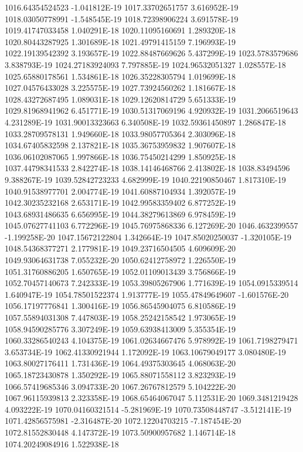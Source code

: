 1016.64354524523  -1.041812E-19
1017.33702651757  3.616952E-19
1018.03050778991  -1.548545E-19
1018.72398906224  3.691578E-19
1019.41747033458  1.040291E-18
1020.11095160691  1.289320E-18
1020.80443287925  1.301689E-18
1021.49791415159  7.196993E-19
1022.19139542392  3.193657E-19
1022.88487669626  5.437299E-19
1023.5783579686  3.838793E-19
1024.27183924093  7.797885E-19
1024.96532051327  1.028557E-18
1025.65880178561  1.534861E-18
1026.35228305794  1.019699E-18
1027.04576433028  3.225575E-19
1027.73924560262  1.181667E-18
1028.43272687495  1.089031E-18
1029.12620814729  5.651333E-19
1029.81968941962  6.451771E-19
1030.51317069196  4.920932E-19
1031.2066519643  4.231289E-19
1031.90013323663  6.340508E-19
1032.59361450897  1.286847E-18
1033.28709578131  1.949660E-18
1033.98057705364  2.303096E-18
1034.67405832598  2.137821E-18
1035.36753959832  1.907607E-18
1036.06102087065  1.997866E-18
1036.75450214299  1.850925E-18
1037.44798341533  2.842274E-18
1038.14146468766  2.413802E-18
1038.83494596  9.388267E-19
1039.52842723233  4.682999E-19
1040.22190850467  1.817310E-19
1040.91538977701  2.004774E-19
1041.60887104934  1.392057E-19
1042.30235232168  2.653171E-19
1042.99583359402  6.877252E-19
1043.68931486635  6.656995E-19
1044.38279613869  6.978459E-19
1045.07627741103  6.772296E-19
1045.76975868336  6.127269E-20
1046.4632399557  -1.199258E-20
1047.15672122804  1.342664E-19
1047.85020250037  -1.320105E-19
1048.54368377271  2.177981E-19
1049.23716504505  4.609609E-20
1049.93064631738  7.055232E-20
1050.62412758972  1.226550E-19
1051.31760886205  1.650765E-19
1052.01109013439  3.756866E-19
1052.70457140673  7.242333E-19
1053.39805267906  1.771639E-19
1054.0915339514  1.640947E-19
1054.78501522374  1.913777E-19
1055.47849649607  -1.601576E-20
1056.17197776841  1.300416E-19
1056.86545904075  6.810586E-19
1057.55894031308  7.447803E-19
1058.25242158542  1.973065E-19
1058.94590285776  3.307249E-19
1059.63938413009  5.355354E-19
1060.33286540243  4.104375E-19
1061.02634667476  5.978992E-19
1061.7198279471  3.653734E-19
1062.41330921944  1.172092E-19
1063.10679049177  3.080480E-19
1063.80027176411  1.731436E-19
1064.49375303645  4.068063E-20
1065.18723430878  1.350292E-19
1065.88071558112  3.823293E-19
1066.57419685346  3.094733E-20
1067.26767812579  5.104222E-20
1067.96115939813  2.323358E-19
1068.65464067047  5.112531E-20
1069.3481219428  4.093222E-19
1070.04160321514  -5.281969E-19
1070.73508448747  -3.512141E-19
1071.42856575981  -2.316487E-20
1072.12204703215  -7.187454E-20
1072.81552830448  4.147372E-19
1073.50900957682  1.146714E-18
1074.20249084916  1.522938E-18
